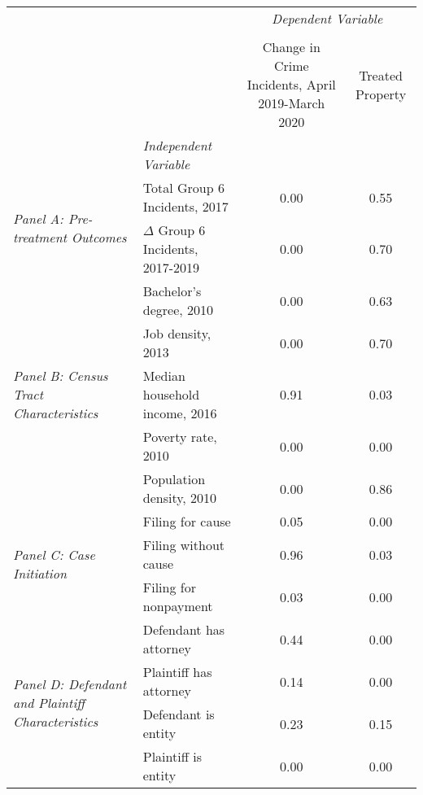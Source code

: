 \begin{tabular}{llcc}
\toprule
 &  & \multicolumn{2}{c}{\textit{Dependent Variable}} \\
\cline{3-4}
\\
 &  & Change in Crime Incidents, April 2019-March 2020 & Treated Property \\
 & \emph{Independent Variable} &  &  \\
\midrule
\multirow[c]{2}{3cm}{\textit{Panel A: Pre-treatment Outcomes}} & Total Group 6 Incidents, 2017 & 0.00 & 0.55 \\
 & $\Delta$ Group 6 Incidents, 2017-2019 & 0.00 & 0.70 \\
\cline{1-4}
\multirow[c]{5}{3cm}{\textit{Panel B: Census Tract Characteristics}} & Bachelor's degree, 2010 & 0.00 & 0.63 \\
 & Job density, 2013 & 0.00 & 0.70 \\
 & Median household income, 2016 & 0.91 & 0.03 \\
 & Poverty rate, 2010 & 0.00 & 0.00 \\
 & Population density, 2010 & 0.00 & 0.86 \\
\cline{1-4}
\multirow[c]{3}{3cm}{\textit{Panel C: Case Initiation}} & Filing for cause & 0.05 & 0.00 \\
 & Filing without cause & 0.96 & 0.03 \\
 & Filing for nonpayment & 0.03 & 0.00 \\
\cline{1-4}
\multirow[c]{4}{3cm}{\textit{Panel D: Defendant and Plaintiff Characteristics}} & Defendant has attorney & 0.44 & 0.00 \\
 & Plaintiff has attorney & 0.14 & 0.00 \\
 & Defendant is entity & 0.23 & 0.15 \\
 & Plaintiff is entity & 0.00 & 0.00 \\
\cline{1-4}
\bottomrule
\end{tabular}

